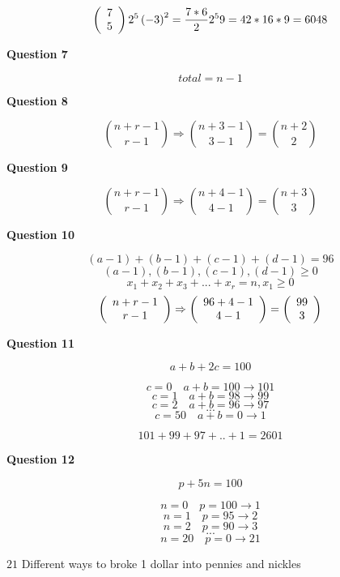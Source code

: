 \documentclass[11pt]{article}
\begin{document}
$$ \left( {\begin{array}{*{20}c} 7 \\ 5 \\ \end{array}} \right)2^5\left(-3\right)^2 = \frac{7*6}{2} 2^5  9 = 42 * 16 * 9 = {6048} $$

\textbf{Question 7}

$$total = n-1$$

\textbf{Question 8 }

$$ {n+r-1 \choose r-1} \Rightarrow {n+3-1 \choose 3-1} = {n+2 \choose 2} $$

\textbf{Question 9 }

$$ {n+r-1 \choose r-1} \Rightarrow {n+4-1 \choose 4-1} = {n+3 \choose 3} $$ 

\textbf{Question 10}

$$\left(a-1\right)+\left(b-1\right)+\left(c-1\right)+\left(d-1\right) = 96 $$
$$\left(a-1\right),\left(b-1\right),\left(c-1\right),\left(d-1\right) \geq 0$$
$$x_1 + x_2 + x_3 + ... + x_r = n , x_1 \geq 0$$ 
$$\left( {\begin{array}{*{20}c} n+r-1 \\ r-1 \\ \end{array}} \right) \Rightarrow \left( {\begin{array}{*{20}c} 96+4-1 \\ 4-1 \\ \end{array}} \right) = \left( {\begin{array}{*{20}c} 99 \\ 3 \\ \end{array}} \right)$$

\textbf{Question 11}
 
 $$a+b+2c = 100$$

 $$c=0  \quad  a+b=100 \rightarrow 101 $$
 $$c=1  \quad  a+b=98  \rightarrow 99 $$
 $$c=2  \quad  a+b=96  \rightarrow 97 $$
 $$...$$
 $$c=50 \quad  a+b=0   \rightarrow 1  $$

 $$101+99+97+..+1 = 2601$$
 
 \textbf{Question 12}
 
 $$p+5n = 100$$
 
$$n=0  \quad p=100 \rightarrow 1$$
$$n=1  \quad p=95 \rightarrow 2$$
$$n=2  \quad p=90 \rightarrow 3$$
$$...$$
$$n=20 \quad p=0 \rightarrow 21$$

$21$ Different ways to broke 1 dollar into pennies and nickles
\end{document}
